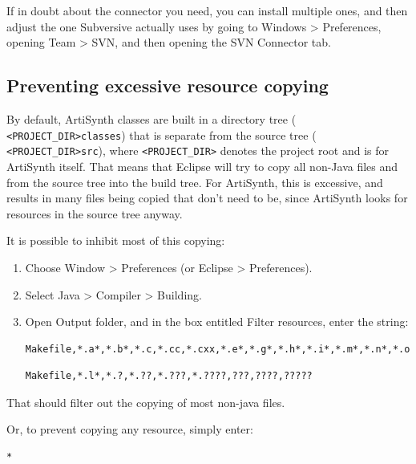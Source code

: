 If in doubt about the connector you need, you can install multiple
ones, and then adjust the one Subversive actually uses by going to
{\sf Windows > Preferences}, opening {\sf Team > SVN}, and then
opening the {\sf SVN Connector} tab.

\subsection{Preventing excessive resource copying}

By default, ArtiSynth classes are built in a directory tree ({\tt
<PROJECT\_DIR>\SEP classes}) that is separate from the source tree ({\tt
<PROJECT\_DIR>\SEP src}), where {\tt <PROJECT\_DIR>} denotes the project
root \directory{} and is \ArtHome[] for ArtiSynth itself.
That means that Eclipse will try to copy all non-Java files and
\directories{} from the source tree into the build tree. For ArtiSynth,
this is excessive, and results in many files being copied that don't
need to be, since ArtiSynth looks for resources in the source tree
anyway.

It is possible to inhibit most of this copying:

\begin{enumerate}

\item Choose {\sf Window > Preferences} (or {\sf Eclipse > Preferences}).

\item Select {\sf Java > Compiler > Building}.

\item Open {\sf Output folder}, and in the box entitled {\sf Filter resources},
  enter the string:

\ifWindows
\begin{lstlisting}[]
    Makefile,*.a*,*.b*,*.c,*.cc,*.cxx,*.e*,*.g*,*.h*,*.i*,*.m*,*.n*,*.o*,*.r*,*.s*,*.t*
\end{lstlisting}
\else
\begin{lstlisting}[]
    Makefile,*.l*,*.?,*.??,*.???,*.????,???,????,?????
\end{lstlisting}
\fi

\end{enumerate}

That should filter out the copying of most non-java files.

Or, to prevent copying any resource, simply enter: 
\begin{lstlisting}[]
    *
\end{lstlisting}

